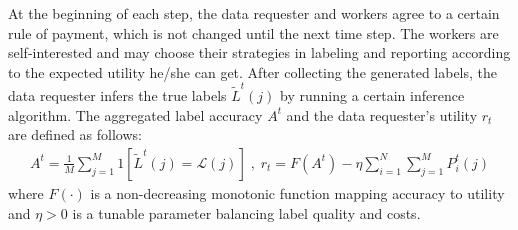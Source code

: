 \documentclass{article}
\newcommand{\com}[1]{\textbf{\color{red}(COMMENT: #1)}} %
\newcommand{\com}[1]{}
\begin{document}
At the beginning of each step, the data requester and workers agree to a certain rule of payment, which is not changed until the next time step.
The workers are self-interested and may choose their strategies in labeling and reporting according to the expected utility he/she can get. %
After collecting the generated labels, the data requester infers the true labels $\tilde{L}^t(j)$ by running a certain inference algorithm.
The aggregated label accuracy $A^t$ and the data requester's utility $r_t$ are defined as follows:
\vspace{-3mm}
\begin{equation}
\label{equation:utility}
\begin{split}
A^t=\frac{1}{M}{\sum}_{j=1}^{M}1\left[\tilde{L}^{t}(j)=\mathcal{L}(j)\right]\;,\;
r_t= F(A^t) - \eta {\sum}_{i=1}^{N}{\sum}_{j=1}^{M}P^t_i(j)
\end{split}
\end{equation}
where $F(\cdot)$ is a non-decreasing monotonic function mapping accuracy to utility and $\eta>0$ is a tunable parameter balancing label quality and costs.


\end{document}
